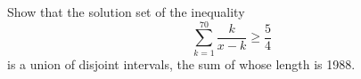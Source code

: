 Show that the solution set of the inequality\[ \sum^{70}_{k = 1} \frac {k}{x - k} \geq \frac {5}{4}
\]
is a union of disjoint intervals, the sum of whose length is 1988.
